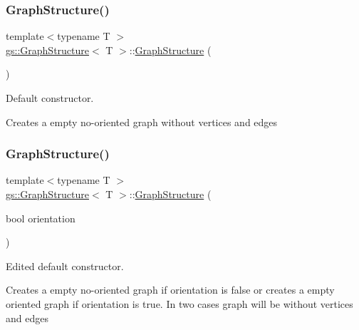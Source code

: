 \subsubsection{\texorpdfstring{Graph\+Structure()}{GraphStructure()}\hspace{0.1cm}{\footnotesize\ttfamily [1/4]}}
{\footnotesize\ttfamily template$<$typename T $>$ \\
\mbox{\hyperlink{classgs_1_1_graph_structure}{gs\+::\+Graph\+Structure}}$<$ T $>$\+::\mbox{\hyperlink{classgs_1_1_graph_structure}{Graph\+Structure}} (\begin{DoxyParamCaption}{ }\end{DoxyParamCaption})}



Default constructor. 

Creates a empty no-\/oriented graph without vertices and edges \mbox{\label{classgs_1_1_graph_structure_aba14df4f7f6e35d54f27d69145603cd5}} 
\subsubsection{\texorpdfstring{Graph\+Structure()}{GraphStructure()}\hspace{0.1cm}{\footnotesize\ttfamily [2/4]}}
{\footnotesize\ttfamily template$<$typename T $>$ \\
\mbox{\hyperlink{classgs_1_1_graph_structure}{gs\+::\+Graph\+Structure}}$<$ T $>$\+::\mbox{\hyperlink{classgs_1_1_graph_structure}{Graph\+Structure}} (\begin{DoxyParamCaption}\item[{bool}]{orientation }\end{DoxyParamCaption})}



Edited default constructor. 

Creates a empty no-\/oriented graph if orientation is false or creates a empty oriented graph if orientation is true. In two cases graph will be without vertices and edges \mbox{\label{classgs_1_1_graph_structure_a7b2ccfb7dfad4317cad69b4296a20173}} 
